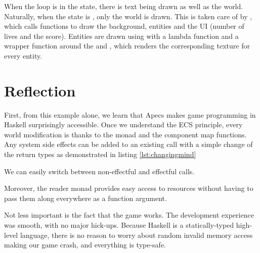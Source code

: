 \documentclass[
  digital, %
  color,   %
  table,   %
  oneside, %
  lof,     %
  lot,     %
]{fithesis3}
\begin{document}
When the loop is in the  state, there is text being drawn
as well as the world. Naturally, when the state is ,
only the world is drawn. This is taken care of by ,
which calls functions to draw the background, entities and the UI
(number of lives and the score). Entities are drawn using 
with a lambda function and a wrapper function around the  and
, which renders the corresponding texture for every entity.


\section{Reflection}
\label{sect:apecsreflection}

First, from this example alone,
we learn that Apecs makes game programming in Haskell surprisingly accessible.
Once we understand the ECS principle, every world modification is
 thanks to the  monad and
the component map functions. Any system side effects can be added
to an existing  call with a simple change of the return types
as demonstrated in listing \ref{lst:changingmind}
\begin{listing}[H]
\caption{We can easily switch between non-effectful and effectful calls.}
\label{lst:changingmind}
\end{listing}

Moreover, the  reader monad provides easy
access to resources without having to pass them along everywhere as a function argument.

Not less important is the fact that the game works.
The development experience was smooth, with no major hick-ups.
Because Haskell is a statically-typed high-level language, there is
no reason to worry about random invalid memory access making our game crash,
and everything is type-safe.
\end{document}

